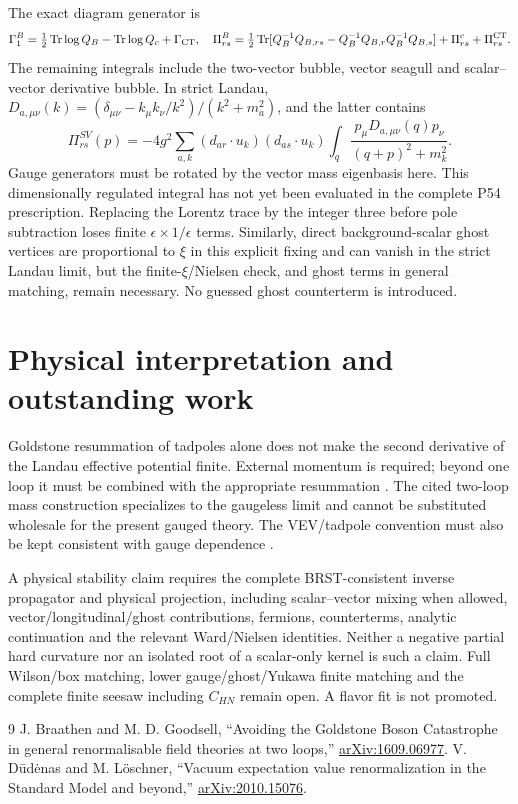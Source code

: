 \documentclass[11pt]{article}
\newcommand{\Tr}{\operatorname{Tr}}
\begin{document}
The exact diagram generator is
\begin{equation}
 \Gamma_1^B=\tfrac12\Tr\log Q_B-\Tr\log Q_c+\Gamma_{\rm CT},\quad
 \Pi^B_{rs}=\tfrac12\Tr[Q_B^{-1}Q_{B,rs}
 -Q_B^{-1}Q_{B,r}Q_B^{-1}Q_{B,s}]+\Pi^c_{rs}+\Pi^{\rm CT}_{rs}.
\end{equation}
The remaining integrals include the two-vector bubble, vector seagull
and scalar--vector derivative bubble. In strict Landau,
$D_{a,\mu\nu}(k)=(\delta_{\mu\nu}-k_\mu k_\nu/k^2)/(k^2+m_a^2)$,
and the latter contains
\begin{equation}
 \Pi^{SV}_{rs}(p)=-4g^2\sum_{a,k}(d_{ar}\cdot u_k)(d_{as}\cdot u_k)
 \int_q\frac{p_\mu D_{a,\mu\nu}(q)p_\nu}{(q+p)^2+m_k^2}.
\end{equation}
Gauge generators must be rotated by the vector mass eigenbasis here.
This dimensionally regulated integral has not yet been evaluated in the
complete P54 prescription. Replacing the Lorentz trace by the integer
three before pole subtraction loses finite $\epsilon\times1/\epsilon$
terms. Similarly, direct background-scalar ghost vertices are proportional
to $\xi$ in this explicit fixing and can vanish in the strict Landau
limit, but the finite-$\xi$/Nielsen check, and ghost terms in general
matching, remain necessary. No guessed ghost counterterm is introduced.

\section{Physical interpretation and outstanding work}
Goldstone resummation of tadpoles alone does not make the second
derivative of the Landau effective potential finite. External momentum
is required; beyond one loop it must be combined with the appropriate
resummation \cite{BG}. The cited two-loop mass construction specializes
to the gaugeless limit and cannot be substituted wholesale for the
present gauged theory. The VEV/tadpole convention must also be kept
consistent with gauge dependence \cite{DL}.

A physical stability claim requires the complete BRST-consistent
inverse propagator and physical projection, including scalar--vector
mixing when allowed, vector/longitudinal/ghost contributions, fermions,
counterterms, analytic continuation and the relevant Ward/Nielsen
identities. Neither a negative partial hard curvature nor an isolated
root of a scalar-only kernel is such a claim. Full Wilson/box matching,
lower gauge/ghost/Yukawa finite matching and the complete finite
seesaw including $C_{HN}$ remain open. A flavor fit is not promoted.

\begin{thebibliography}{9}
 J. Braathen and M. D. Goodsell,
``Avoiding the Goldstone Boson Catastrophe in general renormalisable
field theories at two loops,'' \href{https://arxiv.org/abs/1609.06977}{arXiv:1609.06977}.
 V. D\={u}d\.{e}nas and M. L\"oschner,
``Vacuum expectation value renormalization in the Standard Model and
beyond,'' \href{https://arxiv.org/abs/2010.15076}{arXiv:2010.15076}.
\end{thebibliography}
\end{document}
